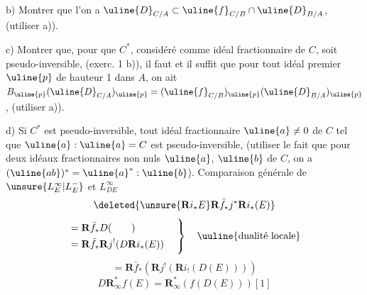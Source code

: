 b) Montrer que l'on a $\uline{D}_{C/A}\subset\uline{f}_{C/B}\cap\uline{D}_{B/A}$, (utiliser a)).

c) Montrer que, pour que $C^*$, considéré comme idéal fractionnaire de $C$, soit pseudo-inversible, (exerc. 1 b)), il faut et il suffit que pour tout idéal premier $\uline{p}$ de hauteur 1 dans $A$, on ait $B_{\uline{p}}(\uline{D}_{C/A})_{\uline{p}}=(\uline{f}_{C/B})_{\uline{p}}(\uline{D}_{B/A})_{\uline{p}}$, (utiliser a)).

d) Si $C^*$ est pseudo-inversible, tout idéal fractionnaire $\uline{a}\neq0$ de $C$ tel que $\uline{a}:\uline{a}=C$ est pseudo-inversible, (utiliser le fait que pour deux idéaux fractionnaires non nuls $\uline{a}$, $\uline{b}$ de $C$, on a $(\uline{ab})^*=\uline{a}^*:\uline{b}$).
Comparaison générale de $\unsure{L_E^\infty|L_E^-}$ et $L_{DE}^\infty$
\[\deleted{\unsure{\mathbf R i_*E}\mathbf R\bar f_*j^*\mathbf R i_*(E)}\]
\[
\begin{aligned}
&=\mathbf R\bar f_*D(\qquad)\\
&=\mathbf R\bar f_*\mathbf R j^!(D\mathbf R i_*(E))
\end{aligned}
\quad\left.\vphantom{\begin{matrix}1\\1\\1\end{matrix}}\right\}\quad\text{\uuline{dualité locale}}
\]
\[=\mathbf R\bar f_*\left(\mathbf R j^!\left(\mathbf R i_!(D(E))\right)\right)\]
\[\boxed{D\mathbf R_\infty^*f(E)=\mathbf R_\infty^*(f(D(E)))[1]}\]

